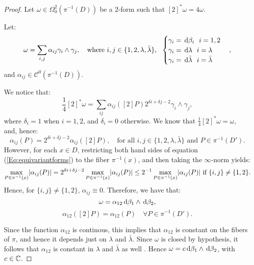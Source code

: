 \documentclass[a4paper,12pt]{article}
\theoremstyle{remark}
\begin{document}
\begin{proof}
	Let $\omega \in \Omega_0^2(\pi^{-1}(D))$ be a $2$-form such that $[2]^*\omega=4 \omega$.
	
	Let:
	\[
	\omega=\sum_{i,j}\alpha_{ij} \gamma_i\wedge \gamma_j, %
	\quad \text{where } i,j \in \{1,2,\lambda,\bar{\lambda}\} \text{, } \ \begin{cases}
	\gamma_i=\de \beta_i \ \ i=1,2 \\
	\gamma_i=\de \lambda \  \ i=\lambda \\
	\gamma_i= \de \bar{\lambda} \ \ i=\bar{\lambda}
	\end{cases},
	\]
	and $\alpha_{ij} \in \mathcal{C}^0(\pi^{-1}(D))$.
	
	
	We notice that: 
	\[
	\frac{1}{4}[2]^*\omega=\sum_{ij}\alpha_{ij}([2]P) 2^{\delta{i}+\delta{j}-2}\gamma_i \wedge \gamma_j,
	\]
	where $\delta_i=1$ when $i=1,2$, and $\delta_i=0$ otherwise.
	We know that $\frac{1}{4}[2]^*\omega=\omega$, and, hence:
	\begin{equation}\label{Eq:equivariantforms}
	\alpha_{ij}(P)=2^{\delta{i}+\delta{j}-2}\alpha_{ij}([2]P), \quad \text{for all } i,j \in \{1,2,\lambda,\bar{\lambda}\} \text{ and } P \in \pi^{-1}(D').
	\end{equation}
	However, for each $x \in D$, restricting both hand sides of equation (\ref{Eq:equivariantforms}) to the fiber $\pi^{-1}(x)$, and then taking the $\infty$-norm yields:
	\[
	\max_{P \in \pi^{-1}(x)} \lvert\alpha_{ij}(P)\rvert=2^{\delta{i}+\delta{j}-2}\max_{P \in \pi^{-1}(x)} \lvert\alpha_{ij}(P)\rvert\leq 2^{-1}\max_{P \in \pi^{-1}(x)} \lvert\alpha_{ij}(P)\rvert \ \text{if } \{i,j\}\neq \{1,2\}.
	\]
	Hence, for $\{i,j\}\neq \{1,2\}$, $\alpha_{ij}\equiv 0$. Therefore, we have that:
	\[
	\omega=\alpha_{12}\,\mathrm d \beta_1 \wedge \,\mathrm d \beta_2,
	\]
	\[
	\alpha_{12}([2]P)=\alpha_{12}(P) \quad \forall P \in \pi^{-1}(D').
	\]
	
	Since the function $\alpha_{12}$ is continous, this implies that $\alpha_{12}$ is constant on the fibers of $\pi$, and hence it depends just on $\lambda$ and $\bar{\lambda}$. Since $\omega$ is closed by hypothesis, it follows that $\alpha_{12}$ is constant in $\lambda$ and $\bar{\lambda}$ as well
	. Hence $\omega = c\,\mathrm d \beta_1 \wedge \,\mathrm d \beta_2$, with $c \in \mathbb C$.
\end{proof}
\end{document}
